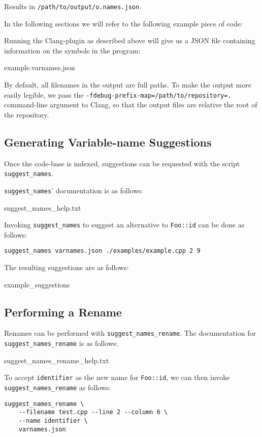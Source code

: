 Results in \lstinline|/path/to/output/o.names.json|.

In the following sections we will refer to the following example piece of \CC{}
code:



Running the Clang-plugin as described above will give us a JSON file containing
information on the symbols in the program:


		{example.varnames.json}

By default, all filenames in the output are full paths. To make the output more
easily legible, we pass the \lstinline|-fdebug-prefix-map=/path/to/repository=.|
command-line argument to Clang, so that the output files are relative the root
of the repository.

\subsection{Generating Variable-name Suggestions}
Once the code-base is indexed, suggestions can be requested with the script
\lstinline|suggest_names|.

\lstinline|suggest_names|' documentation is as follows:

	{suggest_names_help.txt}

Invoking \lstinline|suggest_names| to suggest an alternative to
\lstinline|Foo::id| can be done as follows:

\begin{lstlisting}
suggest_names varnames.json ./examples/example.cpp 2 9
\end{lstlisting}

The resulting suggestions are as follows:

		{example_suggestions}

\subsection{Performing a Rename}
Renames can be performed with \lstinline|suggest_names_rename|.
The documentation for \lstinline|suggest_names_rename| is as follows:

		{suggest_names_rename_help.txt}

To accept \lstinline|identifier| as the new name for \lstinline|Foo::id|, we can
then invoke \lstinline|suggest_names_rename| as follows:
\begin{lstlisting}[caption={Invocation of \lstinline|suggest_name_rename|}]
suggest_names_rename \
	--filename test.cpp --line 2 --column 6 \
	--name identifier \
	varnames.json
\end{lstlisting}

